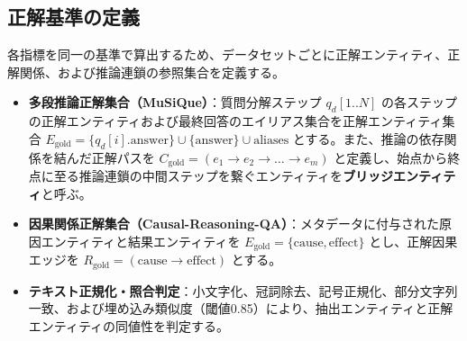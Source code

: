 \documentclass[a4j,dvipdfmx]{jsarticle}
\begin{document}
\subsection{正解基準の定義}
各指標を同一の基準で算出するため、データセットごとに正解エンティティ、正解関係、および推論連鎖の参照集合を定義する。
\begin{itemize}
    \item \textbf{多段推論正解集合（MuSiQue）}：質問分解ステップ $q_d[1..N]$ の各ステップの正解エンティティおよび最終回答のエイリアス集合を正解エンティティ集合 $E_{\text{gold}} = \{q_d[i].\text{answer}\} \cup \{\text{answer}\} \cup \text{aliases}$ とする。また、推論の依存関係を結んだ正解パスを $C_{\text{gold}} = (e_1 \to e_2 \to \dots \to e_m)$ と定義し、始点から終点に至る推論連鎖の中間ステップを繋ぐエンティティを\textbf{ブリッジエンティティ}と呼ぶ。
    \item \textbf{因果関係正解集合（Causal-Reasoning-QA）}：メタデータに付与された原因エンティティと結果エンティティを $E_{\text{gold}} = \{\text{cause}, \text{effect}\}$ とし、正解因果エッジを $R_{\text{gold}} = (\text{cause} \to \text{effect})$ とする。
    \item \textbf{テキスト正規化・照合判定}：小文字化、冠詞除去、記号正規化、部分文字列一致、および埋め込み類似度（閾値0.85）により、抽出エンティティと正解エンティティの同値性を判定する。
\end{itemize}
\end{document}
